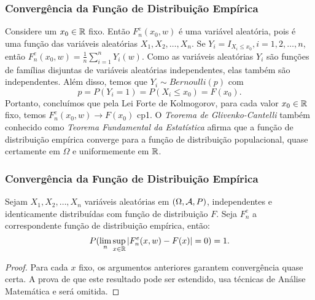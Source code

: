 \begin{frame}
\frametitle{\textbf{Convergência da Função de Distribuição Empírica}}
\baselineskip=13pt
\begin{block}{}


Considere um $x_0\in\mathbb{R}$ fixo. Então $F_n^e(x_0,w)$ é uma variável aleatória, pois é uma função das variáveis aleatórias $X_1,X_2,\ldots,X_n$. Se $Y_i=I_{X_i\leq x_0},i=1,2,\ldots,n$, então $F_n^e(x_0,w)=\frac{1}{n}\sum_{i=1}^{n}Y_i(w)$. Como as variáveis aleatórias $Y_i$ são funções de famílias disjuntas de variáveis aleatórias independentes, elas também são independentes. Além disso, temos que $Y_i\sim Bernoulli(p)$ com
$$p=P(Y_i=1)=P(X_i\leq x_0)=F(x_0).$$
Portanto, concluímos que pela Lei Forte de Kolmogorov, para cada valor $x_0\in\mathbb{R}$ fixo, temos $F_n^e(x_0,w)\rightarrow F(x_0)$ cp1. O {\em Teorema de Glivenko-Cantelli} também conhecido como {\em Teorema Fundamental da Estatística} afirma que a função de distribuição empírica converge para a função de distribuição populacional, quase certamente em $\Omega$ e uniformemente em $\mathbb{R}$.

\end{block}
\end{frame}

\begin{frame}
\frametitle{\textbf{Convergência da Função de Distribuição Empírica}}


\begin{teo}
Sejam $X_1,X_2,\ldots,X_n$ variáveis aleatórias em $(\Omega,{\cal A},P)$, independentes e identicamente distribuídas com função de distribuição $F$. Seja $F_n^e$ a correspondente função de distribuição empírica, então:
$$P(\lim_n\sup_{x\in\mathbb{R}}|F_n^e(x,w)-F(x)|=0)=1.$$
\end{teo}

\begin{proof}
Para cada $x$ fixo, os argumentos anteriores garantem convergência quase certa. A prova de que este resultado pode ser estendido, usa técnicas de Análise Matemática e será omitida.
\end{proof}


\end{frame}

